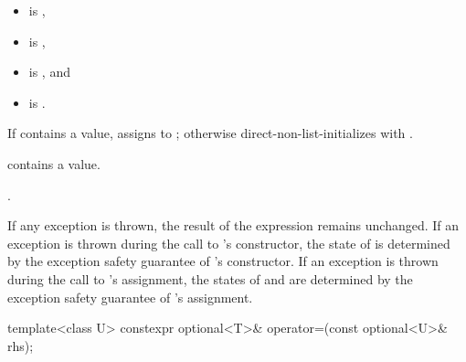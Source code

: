 \begin{itemdescr}
\pnum
\constraints
\begin{itemize}
\item {} is ,
\item {} is ,
\item {} is , and
\item {} is .
\end{itemize}

\pnum
\effects
If  contains a value,
assigns  to ;
otherwise direct-non-list-initializes 
with .

\pnum
\ensures
{} contains a value.

\pnum
\returns
{}.

\pnum
\remarks
If any exception is thrown, the result of the expression  remains unchanged. If an exception is thrown during the call to 's constructor, the state of  is determined by the exception safety guarantee of 's constructor. If an exception is thrown during the call to 's assignment,
the states of  and  are
determined by the exception safety guarantee of 's assignment.
\end{itemdescr}

%
\begin{itemdecl}
template<class U> constexpr optional<T>& operator=(const optional<U>& rhs);
\end{itemdecl}

